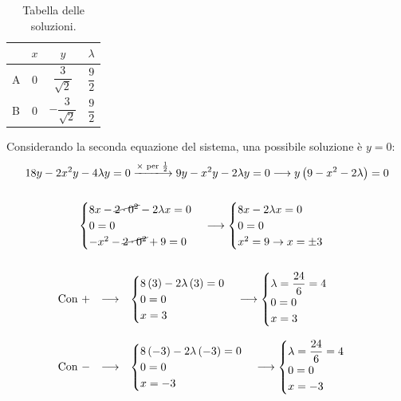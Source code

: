\documentclass[a4paper]{article}
\begin{document}
	\begin{table}[!htp]
		\centering
		\begin{tabular}{@{} l | c | c | c @{}}
			\toprule
			& $x$ & $y$ & $\lambda$ \\
			\midrule
			A & $0$ & $\dfrac{3}{\sqrt{2}}$ & $\dfrac{9}{2}$ \\ [1em]
			B & $0$ & $-\dfrac{3}{\sqrt{2}}$ & $\dfrac{9}{2}$ \\ 
			\bottomrule
		\end{tabular}
		\caption*{Tabella delle soluzioni.}
	\end{table}\newpage

	\noindent
	Considerando la seconda equazione del sistema, una possibile soluzione è $y = 0$:
	\begin{gather*}
		18y - 2x^{2}y - 4 \lambda y = 0 \xlongrightarrow{\times \text{ per } \frac{1}{2}} 9y - x^{2}y - 2 \lambda y = 0 \longrightarrow y\left(9 - x^{2} - 2\lambda\right) = 0 \\
		\\
		\begin{cases}
			8x - \cancel{2 \cdot 0^{2}} - 2\lambda x = 0 \\
			0 = 0 \\
			-x^{2} - \cancel{2 \cdot 0^{2}} + 9 = 0
		\end{cases}
		\longrightarrow
		\begin{cases}
			8x - 2\lambda x = 0 \\
			0 = 0 \\
			x^{2} = 9 \rightarrow x = \pm 3
		\end{cases} \\
		\\
		\begin{array}{rcl}
			\text{Con }+&\longrightarrow& \begin{cases}
				8 \left(3\right) - 2\lambda \left(3\right) = 0 \\
				0 = 0 \\
				x = 3
			\end{cases}
			\longrightarrow
			\begin{cases}
				\lambda = \dfrac{24}{6} = 4 \\
				0 = 0 \\
				x = 3
			\end{cases} \\
			\\
			\text{Con }-&\longrightarrow& \begin{cases}
				8 \left(-3\right) - 2\lambda \left(-3\right) = 0 \\
				0 = 0 \\
				x = -3
			\end{cases}
			\longrightarrow
			\begin{cases}
				\lambda = \dfrac{24}{6} = 4 \\
				0 = 0 \\
				x = -3
			\end{cases}
		\end{array}
	\end{gather*}
\end{document}
